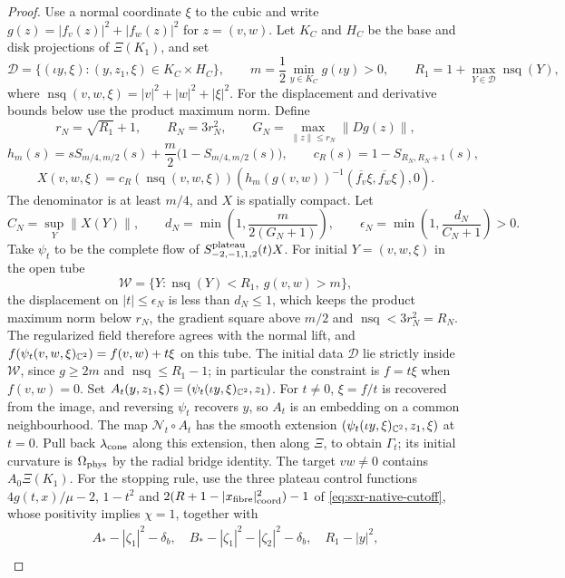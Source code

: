 \begin{proof}
Use a normal coordinate $\xi$ to the cubic and write $g(z)=|f_v(z)|^2+|f_w(z)|^2$ for $z=(v,w)$.
Let $K_C$ and $H_C$ be the base and disk projections of $\Xi(K_1)$, and set
\[
 \mathcal D=\{(\iota y,\xi):(y,z_1,\xi)\in K_C\times H_C\},\qquad
 m=\frac12\min_{y\in K_C}g(\iota y)>0,\qquad
 R_1=1+\max_{Y\in\mathcal D}\operatorname{nsq}(Y),
\]
where $\operatorname{nsq}(v,w,\xi)=|v|^2+|w|^2+|\xi|^2$. For the displacement and derivative bounds below use the product maximum norm. Define
\[
 r_N=\sqrt{R_1}+1,\qquad R_N=3r_N^2,\qquad
 G_N=\max_{\|z\|\le r_N}\|Dg(z)\|,
\]
\[
 h_m(s)=sS_{m/4,m/2}(s)+\frac m2\bigl(1-S_{m/4,m/2}(s)\bigr),\qquad
 c_R(s)=1-S_{R_N,R_N+1}(s),
\]
\[
 X(v,w,\xi)=c_R(\operatorname{nsq}(v,w,\xi))
 \left(h_m(g(v,w))^{-1}(\overline{f_v}\xi,\overline{f_w}\xi),0\right).
\]
The denominator is at least $m/4$, and $X$ is spatially compact. Let
\[
 C_N=\sup_Y\|X(Y)\|,\qquad
 d_N=\min\left(1,\frac{m}{2(G_N+1)}\right),\qquad
 \epsilon_N=\min\left(1,\frac{d_N}{C_N+1}\right)>0.
\]
Take $\psi_t$ to be the complete flow of $S^{\rm plateau}_{-2,-1,1,2}(t)X$. For initial $Y=(v,w,\xi)$ in the open tube
\[
 \mathcal W=\{Y:\operatorname{nsq}(Y)<R_1,\ g(v,w)>m\},
\]
the displacement on $|t|\le\epsilon_N$ is less than $d_N\le1$, which keeps the product maximum
norm below $r_N$, the gradient square above $m/2$ and $\operatorname{nsq}<3r_N^2=R_N$.
The regularized field therefore agrees with the normal lift, and
$f(\psi_t(v,w,\xi)_{\mathbb{C}^2})=f(v,w)+t\xi$ on this tube.
The initial data $\mathcal D$ lie strictly inside $\mathcal W$, since $g\ge2m$ and
$\operatorname{nsq}\le R_1-1$; in particular the constraint is $f=t\xi$ when $f(v,w)=0$.
Set $A_t(y,z_1,\xi)=(\psi_t(\iota y,\xi)_{\mathbb{C}^2},z_1)$.
For $t\ne0$, $\xi=f/t$ is recovered from the image, and reversing $\psi_t$
recovers $y$, so $A_t$ is an embedding on a common neighbourhood.
The map $\mathcal N_t\circ A_t$ has the smooth extension
$(\psi_t(\iota y,\xi)_{\mathbb{C}^2},z_1,\xi)$ at $t=0$.
Pull back $\lambda_{\rm cone}$ along this extension, then along $\Xi$, to obtain $\Gamma_t$; its
initial curvature is $\Omega_{\rm phys}$ by the radial bridge identity. The target $vw\ne0$ contains $A_0\Xi(K_1)$.
For the stopping rule, use the three plateau control functions
$4g(t,x)/\mu-2$, $1-t^2$ and $2(R+1-|x_{\rm fibre}|_{\rm coord}^2)-1$ of \eqref{eq:sxr-native-cutoff}, whose positivity
implies $\chi=1$, together with
\[
 \begin{gathered}
 A_*-|\zeta_1|^2-\delta_b,\quad
 B_*-|\zeta_1|^2-|\zeta_2|^2-\delta_b,\quad
 R_1-|y|^2,\\

\end{gathered}\]
\end{proof}
